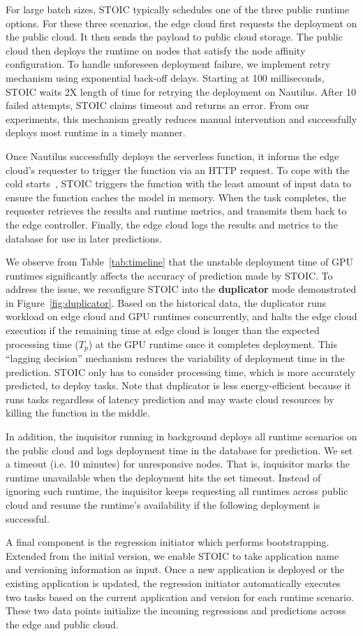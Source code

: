 For large batch sizes, STOIC typically schedules one of the three public
runtime options. For these three scenarios, the edge cloud first requests the
deployment on the public cloud. It then sends the payload to public cloud
storage. The public cloud then deploys the runtime on nodes that satisfy the
node affinity configuration. To handle unforeseen deployment failure, we
implement retry mechanism using exponential back-off delays. Starting at 100
milliseconds, STOIC waits 2X length of time for retrying the deployment on
Nautilus. After 10 failed attempts, STOIC claims timeout and returns an error.
From our experiments, this mechanism greatly reduces manual intervention and
successfully deploys most runtime in a timely manner.
 
Once Nautilus successfully deploys the serverless function, it informs the
edge cloud's requester to trigger the function via an HTTP request. To cope
with the cold starts~\cite{ref:coldstart}, STOIC triggers the function with
the least amount of input data to ensure the function caches the model in
memory. When the task completes, the requester retrieves the results and
runtime metrics, and transmits them back to the edge controller. Finally, the
edge cloud logs the results and metrics to the database for use in later
predictions. 

We observe from Table~\ref{tab:timeline} that the unstable deployment time of
GPU runtimes significantly affects the accuracy of prediction made by STOIC.
To address the issue, we reconfigure STOIC into the \textbf{duplicator} mode
demonstrated in Figure~\ref{fig:duplicator}. Based on the historical data, the
duplicator runs workload on edge cloud and GPU runtimes concurrently, and
halts the edge cloud execution if the remaining time at edge cloud is longer
than the expected processing time ($T_p$) at the GPU runtime once it completes
deployment. This ``lagging decision'' mechanism reduces the variability of
deployment time in the prediction. STOIC only has to consider processing time,
which is more accurately predicted, to deploy tasks. Note that duplicator is
less energy-efficient because it runs tasks regardless of latency prediction
and may waste cloud resources by killing the function in the middle. 

In addition, the inquisitor running in background deploys all runtime
scenarios on the public cloud and logs deployment time in the database for
prediction. We set a timeout (i.e. 10 minutes) for unresponsive nodes. That
is, inquisitor marks the runtime unavailable when the deployment hits the set
timeout. Instead of ignoring such runtime, the inquisitor keeps requesting all
runtimes across public cloud and resume the runtime's availability if the
following deployment is successful.

A final component is the regression initiator which performs bootstrapping.
Extended from the initial version, we enable STOIC to take application name
and versioning information as input. Once a new application is deployed or the
existing application is updated, the regression initiator automatically
executes two tasks based on the current application and version for each
runtime scenario. These two data points initialize the incoming regressions
and predictions across the edge and public cloud.

